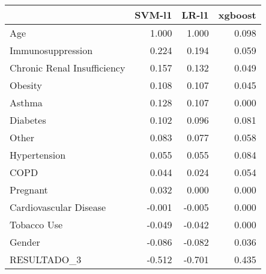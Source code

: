 \begin{tabular}{lrrr}
\toprule
{} &  SVM-l1 &  LR-l1 &  xgboost \\
\midrule
Age                         &   1.000 &  1.000 &    0.098 \\
Immunosuppression           &   0.224 &  0.194 &    0.059 \\
Chronic Renal Insufficiency &   0.157 &  0.132 &    0.049 \\
Obesity                     &   0.108 &  0.107 &    0.045 \\
Asthma                      &   0.128 &  0.107 &    0.000 \\
Diabetes                    &   0.102 &  0.096 &    0.081 \\
Other                       &   0.083 &  0.077 &    0.058 \\
Hypertension                &   0.055 &  0.055 &    0.084 \\
COPD                        &   0.044 &  0.024 &    0.054 \\
Pregnant                    &   0.032 &  0.000 &    0.000 \\
Cardiovascular Disease      &  -0.001 & -0.005 &    0.000 \\
Tobacco Use                 &  -0.049 & -0.042 &    0.000 \\
Gender                      &  -0.086 & -0.082 &    0.036 \\
RESULTADO\_3                 &  -0.512 & -0.701 &    0.435 \\
\bottomrule
\end{tabular}
